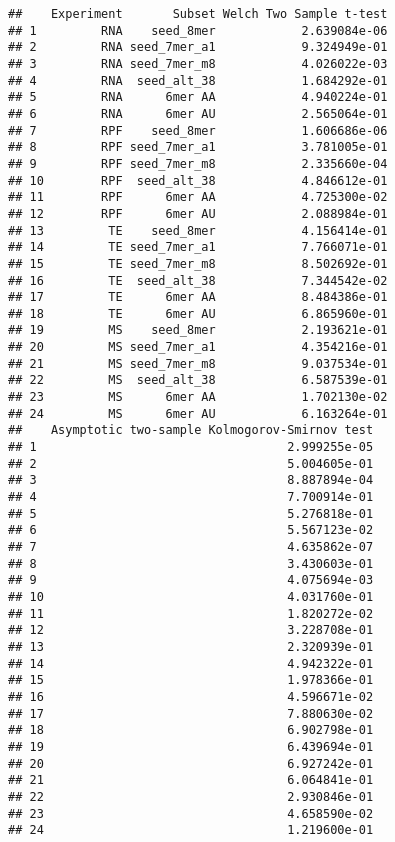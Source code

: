 \documentclass[
]{article}
\begin{document}
\begin{verbatim}
##    Experiment       Subset Welch Two Sample t-test
## 1         RNA    seed_8mer            2.639084e-06
## 2         RNA seed_7mer_a1            9.324949e-01
## 3         RNA seed_7mer_m8            4.026022e-03
## 4         RNA  seed_alt_38            1.684292e-01
## 5         RNA      6mer AA            4.940224e-01
## 6         RNA      6mer AU            2.565064e-01
## 7         RPF    seed_8mer            1.606686e-06
## 8         RPF seed_7mer_a1            3.781005e-01
## 9         RPF seed_7mer_m8            2.335660e-04
## 10        RPF  seed_alt_38            4.846612e-01
## 11        RPF      6mer AA            4.725300e-02
## 12        RPF      6mer AU            2.088984e-01
## 13         TE    seed_8mer            4.156414e-01
## 14         TE seed_7mer_a1            7.766071e-01
## 15         TE seed_7mer_m8            8.502692e-01
## 16         TE  seed_alt_38            7.344542e-02
## 17         TE      6mer AA            8.484386e-01
## 18         TE      6mer AU            6.865960e-01
## 19         MS    seed_8mer            2.193621e-01
## 20         MS seed_7mer_a1            4.354216e-01
## 21         MS seed_7mer_m8            9.037534e-01
## 22         MS  seed_alt_38            6.587539e-01
## 23         MS      6mer AA            1.702130e-02
## 24         MS      6mer AU            6.163264e-01
##    Asymptotic two-sample Kolmogorov-Smirnov test
## 1                                   2.999255e-05
## 2                                   5.004605e-01
## 3                                   8.887894e-04
## 4                                   7.700914e-01
## 5                                   5.276818e-01
## 6                                   5.567123e-02
## 7                                   4.635862e-07
## 8                                   3.430603e-01
## 9                                   4.075694e-03
## 10                                  4.031760e-01
## 11                                  1.820272e-02
## 12                                  3.228708e-01
## 13                                  2.320939e-01
## 14                                  4.942322e-01
## 15                                  1.978366e-01
## 16                                  4.596671e-02
## 17                                  7.880630e-02
## 18                                  6.902798e-01
## 19                                  6.439694e-01
## 20                                  6.927242e-01
## 21                                  6.064841e-01
## 22                                  2.930846e-01
## 23                                  4.658590e-02
## 24                                  1.219600e-01
\end{verbatim}
\end{document}
